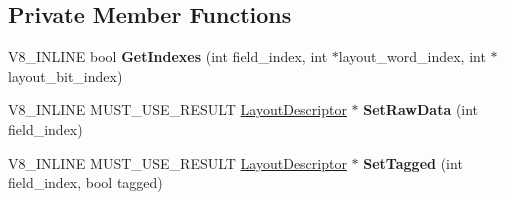 \subsection*{Private Member Functions}
\begin{DoxyCompactItemize}
\item 
V8\+\_\+\+I\+N\+L\+I\+NE bool {\bfseries Get\+Indexes} (int field\+\_\+index, int $\ast$layout\+\_\+word\+\_\+index, int $\ast$layout\+\_\+bit\+\_\+index)\hypertarget{classv8_1_1internal_1_1_layout_descriptor_a3f4ae2742a4e54abcf90565c00c07fc9}{}\label{classv8_1_1internal_1_1_layout_descriptor_a3f4ae2742a4e54abcf90565c00c07fc9}

\item 
V8\+\_\+\+I\+N\+L\+I\+NE M\+U\+S\+T\+\_\+\+U\+S\+E\+\_\+\+R\+E\+S\+U\+LT \hyperlink{classv8_1_1internal_1_1_layout_descriptor}{Layout\+Descriptor} $\ast$ {\bfseries Set\+Raw\+Data} (int field\+\_\+index)\hypertarget{classv8_1_1internal_1_1_layout_descriptor_af5dbcdd7a44fc60f15ea98360636c3a1}{}\label{classv8_1_1internal_1_1_layout_descriptor_af5dbcdd7a44fc60f15ea98360636c3a1}

\item 
V8\+\_\+\+I\+N\+L\+I\+NE M\+U\+S\+T\+\_\+\+U\+S\+E\+\_\+\+R\+E\+S\+U\+LT \hyperlink{classv8_1_1internal_1_1_layout_descriptor}{Layout\+Descriptor} $\ast$ {\bfseries Set\+Tagged} (int field\+\_\+index, bool tagged)\hypertarget{classv8_1_1internal_1_1_layout_descriptor_ab08e8a560402096805a99dc9c7b678e3}{}\label{classv8_1_1internal_1_1_layout_descriptor_ab08e8a560402096805a99dc9c7b678e3}

\end{DoxyCompactItemize}
